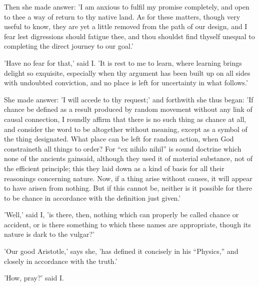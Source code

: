 Then she made answer: 'I am anxious to fulfil my promise completely, and
open to thee a way of return to thy native land. As for these matters,
though very useful to know, they are yet a little removed from the path
of our design, and I fear lest digressions should fatigue thee, and thou
shouldst find thyself unequal to completing the direct journey to our
goal.'

'Have no fear for that,' said I. 'It is rest to me to learn, where
learning brings delight so exquisite, especially when thy argument has
been built up on all sides with undoubted conviction, and no place is
left for uncertainty in what follows.'

She made answer: 'I will accede to thy request;' and forthwith she thus
began: 'If chance be defined as a result produced by random movement
without any link of causal connection, I roundly affirm that there is no
such thing as chance at all, and consider the word to be altogether
without meaning, except as a symbol of the thing designated. What place
can be left for random action, when God constraineth all things to
order? For ``ex nihilo nihil'' is sound doctrine which none of the
ancients gainsaid, although they used it of material substance, not of
the efficient principle; this they laid down as a kind of basis for all
their reasonings concerning nature. Now, if a thing arise without
causes, it will appear to have arisen from nothing. But if this cannot
be, neither is it possible for there to be chance in accordance with the
definition just given.'

'Well,' said I, 'is there, then, nothing which can properly be called
chance or accident, or is there something to which these names are
appropriate, though its nature is dark to the vulgar?'

'Our good Aristotle,' says she, 'has defined it concisely in his
``Physics,'' and closely in accordance with the truth.'

'How, pray?' said I.


